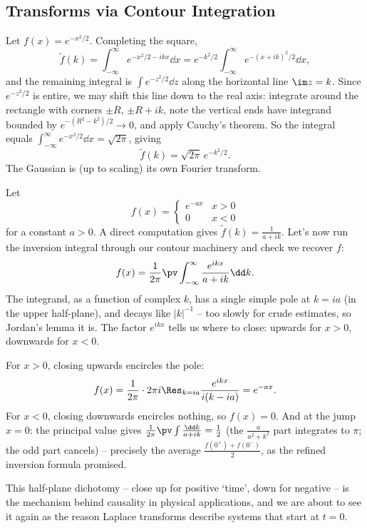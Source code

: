 \subsection{Transforms via Contour Integration}

\begin{example}
	Let $f(x) = e^{-x^2/2}$. Completing the square,
	$$
	\tilde f(k) = \int_{-\infty}^\infty e^{-x^2/2 - ikx} \dd x = e^{-k^2/2} \int_{-\infty}^\infty e^{-(x + ik)^2/2} \dd x,
	$$
	and the remaining integral is $\int e^{-z^2/2} \dd z$ along the horizontal line $\im z = k$. Since $e^{-z^2/2}$ is entire, we may shift this line down to the real axis: integrate around the rectangle with corners $\pm R$, $\pm R + ik$, note the vertical ends have integrand bounded by $e^{-(R^2 - k^2)/2} \to 0$, and apply Cauchy's theorem. So the integral equals $\int_{-\infty}^\infty e^{-x^2/2} \dd x = \sqrt{2\pi}$, giving
	$$
	\tilde f(k) = \sqrt{2\pi}\, e^{-k^2/2}.
	$$
	The Gaussian is (up to scaling) its own Fourier transform.
\end{example}

\begin{example}
	Let
	$$
	f(x) = \begin{cases} e^{-ax} & x > 0 \\ 0 & x < 0\end{cases}
	$$
	for a constant $a > 0$. A direct computation gives $\tilde f(k) = \frac{1}{a + ik}$. Let's now run the inversion integral through our contour machinery and check we recover $f$:
	$$
	f(x) = \frac{1}{2\pi} \pv\int_{-\infty}^\infty \frac{e^{ikx}}{a + ik} \dd k.
	$$
	The integrand, as a function of complex $k$, has a single simple pole at $k = ia$ (in the upper half-plane), and decays like $|k|^{-1}$ -- too slowly for crude estimates, so Jordan's lemma it is. The factor $e^{ikx}$ tells us where to close: upwards for $x > 0$, downwards for $x < 0$.

	For $x > 0$, closing upwards encircles the pole:
	$$
	f(x) = \frac{1}{2\pi} \cdot 2\pi i \Res_{k = ia} \frac{e^{ikx}}{i(k - ia)} = e^{-ax}.
	$$
	For $x < 0$, closing downwards encircles nothing, so $f(x) = 0$. And at the jump $x = 0$: the principal value gives $\frac{1}{2\pi}\pv \int \frac{\dd k}{a + ik} = \frac 12$ (the $\frac{a}{a^2 + k^2}$ part integrates to $\pi$; the odd part cancels) -- precisely the average $\frac{f(0^+) + f(0^-)}{2}$, as the refined inversion formula promised.
\end{example}

This half-plane dichotomy -- close up for positive `time', down for negative -- is the mechanism behind causality in physical applications, and we are about to see it again as the reason Laplace transforms describe systems that start at $t = 0$.

